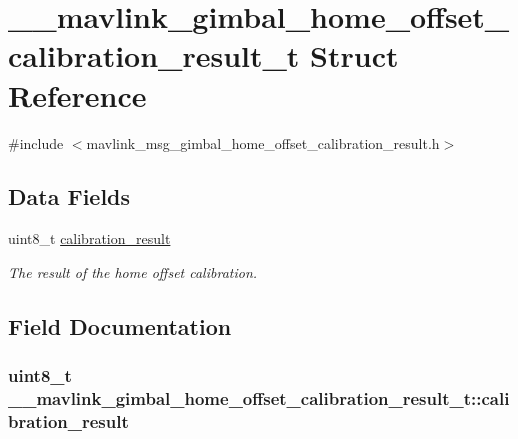 \hypertarget{struct____mavlink__gimbal__home__offset__calibration__result__t}{\section{\+\_\+\+\_\+mavlink\+\_\+gimbal\+\_\+home\+\_\+offset\+\_\+calibration\+\_\+result\+\_\+t Struct Reference}
\label{struct____mavlink__gimbal__home__offset__calibration__result__t}
}


{\ttfamily \#include $<$mavlink\+\_\+msg\+\_\+gimbal\+\_\+home\+\_\+offset\+\_\+calibration\+\_\+result.\+h$>$}

\subsection*{Data Fields}
\begin{DoxyCompactItemize}
\item 
uint8\+\_\+t \hyperlink{struct____mavlink__gimbal__home__offset__calibration__result__t_a6997da1fea8d9b1a0319b3fb6f32caec}{calibration\+\_\+result}
\begin{DoxyCompactList}\small\item\em The result of the home offset calibration. \end{DoxyCompactList}\end{DoxyCompactItemize}


\subsection{Field Documentation}
\hypertarget{struct____mavlink__gimbal__home__offset__calibration__result__t_a6997da1fea8d9b1a0319b3fb6f32caec}{
\subsubsection[{calibration\+\_\+result}]{\setlength{\rightskip}{0pt plus 5cm}uint8\+\_\+t \+\_\+\+\_\+mavlink\+\_\+gimbal\+\_\+home\+\_\+offset\+\_\+calibration\+\_\+result\+\_\+t\+::calibration\+\_\+result}}\label{struct____mavlink__gimbal__home__offset__calibration__result__t_a6997da1fea8d9b1a0319b3fb6f32caec}


